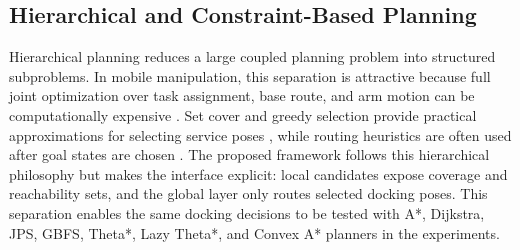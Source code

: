 \subsection{Hierarchical and Constraint-Based Planning}
Hierarchical planning reduces a large coupled planning problem into structured subproblems. In mobile manipulation, this separation is attractive because full joint optimization over task assignment, base route, and arm motion can be computationally expensive \cite{zhao2024survey}. Set cover and greedy selection provide practical approximations for selecting service poses \cite{chvatal1979greedy}, while routing heuristics are often used after goal states are chosen \cite{lavalle2006planning}. The proposed framework follows this hierarchical philosophy but makes the interface explicit: local candidates expose coverage and reachability sets, and the global layer only routes selected docking poses. This separation enables the same docking decisions to be tested with A*, Dijkstra, JPS, GBFS, Theta*, Lazy Theta*, and Convex A* planners in the experiments.
